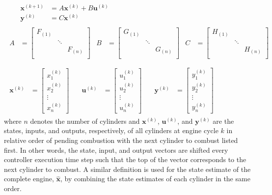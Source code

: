 \begin{gather}
\begin{aligned}
&& \mathbf x^{(k+1)} &= A \mathbf x^{(k)}+ B \mathbf u^{(k)}\\
&& \mathbf y^{(k)} &= C \mathbf x^{(k)} \label{eq:multCylModel}
\end{aligned}\\
\begin{aligned}
A &=
\begin{bmatrix}
F_{(1)} & &   \\
 & \ddots & \\
&  & F_{(n)} \\[2ex]
\end{bmatrix} &
B &=
\begin{bmatrix}
G_{(1)} & &  \\
 & \ddots & \\
 & & G_{(n)}  \\
\end{bmatrix} &
C &=
\begin{bmatrix}
H_{(1)} & &   \\
 & \ddots & \\
 & & H_{(n)} \\
\end{bmatrix} \nonumber \\
\end{aligned}\\
\begin{aligned}
\mathbf x^{(k)} &=
\begin{bmatrix}
x_{1}^{(k)}   \\[0.3em]
x_{2}^{(k)}   \\[0.3em]
\vdots      \\[0.3em]
x_{n}^{(k)}
\end{bmatrix} \quad &
\mathbf u^{(k)} &=
\begin{bmatrix}
u_{1}^{(k)}   \\[0.3em]
u_{2}^{(k)}   \\[0.3em]
\vdots      \\[0.3em]
u_{n}^{(k)}
\end{bmatrix} \quad &
\mathbf y^{(k)} &=
\begin{bmatrix}
y_{1}^{(k)}   \\[0.3em]
y_{2}^{(k)}   \\[0.3em]
\vdots      \\[0.3em]
y_{n}^{(k)}
\end{bmatrix} \nonumber
\end{aligned}
\end{gather}
where $n$ denotes the number of cylinders and $\mathbf x^{(k)}$, $\mathbf u^{(k)}$, and $\mathbf y^{(k)}$ are the states, inputs, and outputs, respectively, of all cylinders at engine cycle $k$ in relative order of pending combustion with the next cylinder to combust listed first. In other words, the state, input, and output vectors are shifted every controller execution time step such that the top of the vector corresponds to the next cylinder to combust. A similar definition is used for the state estimate of the complete engine, $\mathbf{\hat x}$, by combining the state estimates of each cylinder in the same order.

